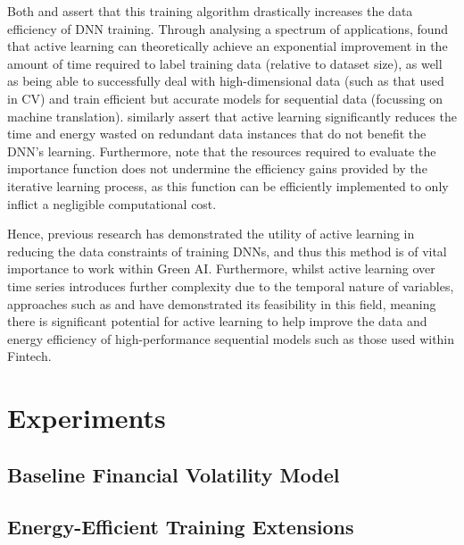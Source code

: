 \documentclass[a4paper, 11pt]{report}
\begin{document}
    Both \citet{ren-2021} and \citet{xu-2021} assert that this training algorithm drastically increases the data efficiency of DNN training. Through analysing a spectrum of applications, \citet{ren-2021} found that active learning can theoretically achieve an exponential improvement in the amount of time required to label training data (relative to dataset size), as well as being able to successfully deal with high-dimensional data (such as that used in CV) and train efficient but accurate models for sequential data (focussing on machine translation). \citet{xu-2021} similarly assert that active learning significantly reduces the time and energy wasted on redundant data instances that do not benefit the DNN's learning. Furthermore, \citet{ren-2021} note that the resources required to evaluate the importance function does not undermine the efficiency gains provided by the iterative learning process, as this function can be efficiently implemented to only inflict a negligible computational cost. 

    Hence, previous research has demonstrated the utility of active learning in reducing the data constraints of training DNNs, and thus this method is of vital importance to work within Green AI. Furthermore, whilst active learning over time series introduces further complexity due to the temporal nature of variables, approaches such as \citet{peng-2017} and \citet{zimmer-2018} have demonstrated its feasibility in this field, meaning there is significant potential for active learning to help improve the data and energy efficiency of high-performance sequential models such as those used within Fintech.



    \newpage
    \chapter{Experiments}
    \label{chapter: experiments}

    \section{Baseline Financial Volatility Model}
    \label{section: baseline}

    \section{Energy-Efficient Training Extensions}
    \label{section: energy-extensions}
\end{document}
